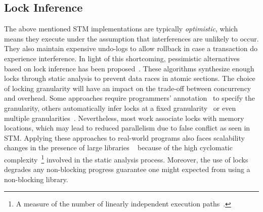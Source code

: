 \documentclass[10pt,conference,compsocconf]{IEEEtran}
\begin{document}
\subsection{Lock Inference}
The above mentioned STM implementations are typically \emph{optimistic}, which means they execute under the assumption that interferences are unlikely to occur.
They also maintain expensive undo-logs to allow rollback in case a transaction do experience interference.
In light of this shortcoming, pessimistic alternatives based on lock inference has been proposed~\cite{mccloskey2006autolocker}.
These algorithms synthesize enough locks through static analysis to prevent data races in atomic sections.
The choice of locking granularity will have an impact on the trade-off between concurrency and overhead.
Some approaches require programmers' annotation~\cite{golan2013concurrent} to specify the granularity, others automatically infer locks at a fixed granularity~\cite{emmi2007lock} or even multiple granularities~\cite{cherem2008inferring}.
Nevertheless, most work associate locks with memory locations, which may lead to reduced parallelism due to false conflict as seen in STM. 
Applying these approaches to real-world programs also faces scalability changes in the presence of large libraries ~\cite{gudka2012lock} because of the high cyclomatic complexity~\footnote{A measure of the number of linearly independent execution paths~\cite{mccabe1976complexity}.} involved in the static analysis process.
Moreover, the use of locks degrades any non-blocking progress guarantee one might expected from using a non-blocking library.
\end{document}
